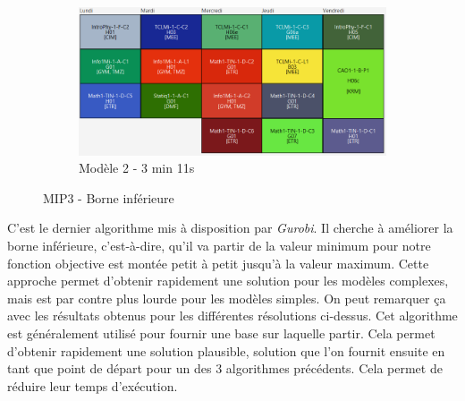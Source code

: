 \begin{figure}[H]
    \hfill
    \begin{subfigure}{0.3\linewidth}
        \centering
        \includegraphics[width=\linewidth]{./assets/figures/perfMIP3const2_191.png}
        \caption{Modèle 2 - 3 min 11s}
    \end{subfigure}
    \caption{MIP3 - Borne inférieure}
\end{figure}

C'est le dernier algorithme mis à disposition par \textit{Gurobi}. Il cherche à améliorer la borne inférieure, c'est-à-dire, qu'il va partir de la valeur minimum pour notre fonction objective est montée petit à petit jusqu'à la valeur maximum. Cette approche permet d'obtenir rapidement une solution pour les modèles complexes, mais est par contre plus lourde pour les modèles simples. On peut remarquer ça avec les résultats obtenus pour les différentes résolutions ci-dessus. Cet algorithme est généralement utilisé pour fournir une base sur laquelle partir. Cela permet d'obtenir rapidement une solution plausible, solution que l'on fournit ensuite en tant que point de départ pour un des 3 algorithmes précédents. Cela permet de réduire leur temps d'exécution.